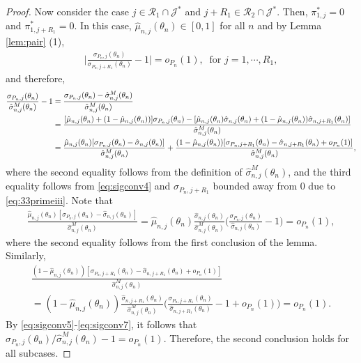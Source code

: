\documentclass[letterpaper,11pt]{article}
\theoremstyle{myplain}
\theoremstyle{mydefinition}
\theoremstyle{myremark}
\numberwithin{equation}{section}
\numberwithin{figure}{section}
\begin{document}
\begin{appendices}
\begin{proof}
Now consider the case $j\in\mathcal R_1\cap\mathcal J^*$ and $j+R_1\in\mathcal R_2\cap\mathcal J^*.$ Then, $\pi^*_{1,j}=0$ and $\pi^*_{1,j+R_1}=0.$ In this case, $\hat \mu_{n,j}(\theta_n)\in[0,1]$ for all $n$ and by Lemma \ref{lem:pair} (1),
\begin{align}
	\Big|\frac{\sigma_{P_{n},j}(\theta_n)}{\sigma_{P_{n},{j+R_1}}(\theta_n)} - 1\Big|=o_{P_n}(1),~ \text{ for } j=1,\cdots,R_1,\label{eq:sigconv4}
\end{align}
and therefore,
\begin{align}
\frac{\sigma_{P_n,j}(\theta_n)}{\hat\sigma^M_{n,j}(\theta_n)}-1&=\frac{\sigma_{P_n,j}(\theta_n)-\hat\sigma^M_{n,j}(\theta_n)}{\hat\sigma^M_{n,j}(\theta_n)}\notag\\
&=\frac{[\hat \mu_{n,j}(\theta_n)+(1-\hat \mu_{n,j}(\theta_n))]\sigma_{P_n,j}(\theta_n)-[\hat \mu_{n,j}(\theta_n)\hat\sigma_{n,j}(\theta_n)+(1-\hat \mu_{n,j}(\theta_n))\hat\sigma_{n,j+R_1}(\theta_n)]}{\hat\sigma^M_{n,j}(\theta_n)}\notag\\
&=\frac{\hat \mu_{n,j}(\theta_n)[\sigma_{P_n,j}(\theta_n)-\hat\sigma_{n,j}(\theta_n)]}{\hat\sigma^M_{n,j}(\theta_n)}+\frac{(1-\hat \mu_{n,j}(\theta_n))[\sigma_{P_n,j+R_1}(\theta_n)-\hat\sigma_{n,j+R_1}(\theta_n)+o_{P_n}(1)]}{\hat\sigma^M_{n,j}(\theta_n)},\label{eq:sigconv5}
\end{align}
where the second equality follows from the definition of $\hat \sigma^M_{n,j}(\theta_n)$, and the third equality follows from \eqref{eq:sigconv4} and $\sigma_{P_n,j+R_1}$ bounded away from 0 due to \eqref{eq:33primeiii}. Note that
\begin{align}
	\frac{\hat \mu_{n,j}(\theta_n)[\sigma_{P_n,j}(\theta_n)-\hat\sigma_{n,j}(\theta_n)]}{\hat\sigma^M_{n,j}(\theta_n)}=\hat \mu_{n,j}(\theta_n)\frac{\hat\sigma_{n,j}(\theta_n)}{\hat\sigma^M_{n,j}(\theta_n)}\Big(\frac{\sigma_{P_n,j}(\theta_n)}{\hat\sigma_{n,j}(\theta_n)}-1\Big)=o_{P_n}(1),\label{eq:sigconv6}
\end{align}
where the second equality follows from the first conclusion of the lemma. Similarly,
\begin{multline}
	\frac{(1-\hat \mu_{n,j}(\theta_n))[\sigma_{P_n,j+R_1}(\theta_n)-\hat\sigma_{n,j+R_1}(\theta_n)+o_{P_n}(1)]}{\hat\sigma^M_{n,j}(\theta_n)}
	\\
	=	(1-\hat \mu_{n,j}(\theta_n))\frac{\hat\sigma_{n,j+R_1}(\theta_n)}{\hat\sigma^M_{n,j}(\theta_n)}\Big(\frac{\sigma_{P_n,j+R_1}(\theta_n)}{\hat\sigma_{n,j+R_1}(\theta_n)}-1+o_{P_n}(1)\Big)=o_{P_n}(1).\label{eq:sigconv7}
\end{multline}
By \eqref{eq:sigconv5}-\eqref{eq:sigconv7}, it follows that $\sigma_{P_n,j}(\theta_n)/\hat\sigma^M_{n,j}(\theta_n)-1=o_{P_n}(1)$. Therefore, the second conclusion holds for all subcases.
 \end{proof}
 

\end{appendices}
\end{document}
